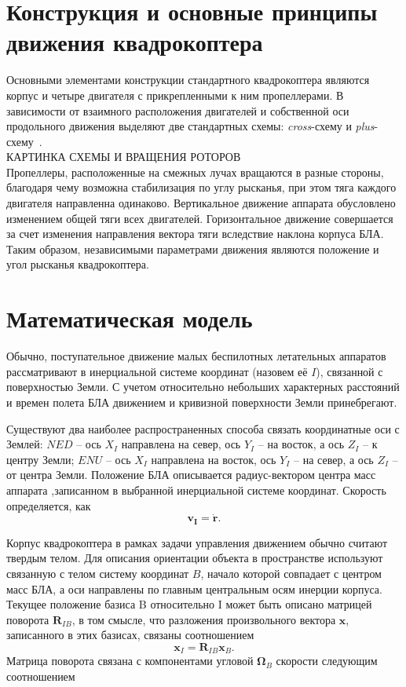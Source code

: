 \documentclass[a4paper,14pt,oneside,openany]{memoir}
\begin{document}
	\section{Конструкция и основные принципы движения квадрокоптера}
	
	Основными элементами конструкции стандартного квадрокоптера являются корпус и четыре двигателя с прикрепленными к ним пропеллерами. В зависимости от взаимного расположения двигателей и собственной оси продольного движения выделяют две стандартных схемы: \textit{cross}-схему и \textit{plus}-схему~\cite{Bashi01}.
	\\
	
	КАРТИНКА СХЕМЫ И ВРАЩЕНИЯ РОТОРОВ
	\\
	
	Пропеллеры, расположенные на смежных лучах вращаются в разные стороны, благодаря чему возможна стабилизация по углу рысканья, при этом тяга каждого двигателя направленна одинаково. Вертикальное движение аппарата обусловлено изменением общей тяги всех двигателей. Горизонтальное движение совершается за счет изменения направления вектора тяги вследствие наклона корпуса БЛА. Таким образом, независимыми параметрами движения являются положение и угол рысканья квадрокоптера. 
	
	\section{Математическая модель}
		
	Обычно, поступательное движение малых беспилотных летательных аппаратов рассматривают в инерциальной системе координат (назовем её {$I$}), связанной с поверхностью Земли. С учетом относительно небольших характерных расстояний и времен полета БЛА движением и кривизной поверхности Земли принебрегают.
	
	Существуют два наиболее распространенных способа связать координатные оси с Землей: {$NED$} --  ось \textbf{$X_I$} направлена на север, ось \textbf{$Y_I$} -- на восток, а ось \textbf{$Z_I$} -- к центру Земли; {$ENU$} -- ось \textbf{$X_I$} направлена на восток, ось \textbf{$Y_I$} -- на север, а ось \textbf{$Z_I$} -- от центра Земли. Положение БЛА описывается радиус-вектором центра масс аппарата ,записанном в выбранной инерциальной системе координат. Скорость определяется, как
	\begin{equation} \label{eq:velocity}
	\bm{v_I} = \dot{\bm{r}}.
	\end{equation}
	
	Корпус квадрокоптера в рамках задачи управления движением обычно считают твердым телом. Для описания ориентации объекта в пространстве используют связанную с телом систему координат $B$, начало которой совпадает с центром масс БЛА, а оси направлены по главным центральным осям инерции корпуса. Текущее положение базиса B относительно I может быть описано матрицей поворота $\bm{R}_{IB}$, в том смысле, что разложения произвольного вектора $\bm{x}$, записанного в этих базисах, связаны соотношением
	\begin{equation} \label{eq:rotmx}
	\bm{x}_I = \bm{R}_{IB}\bm{x}_B.
	\end{equation}
	Матрица поворота связана с компонентами угловой $\bm{\Omega}_B$ скорости следующим соотношением
	
\end{document}
